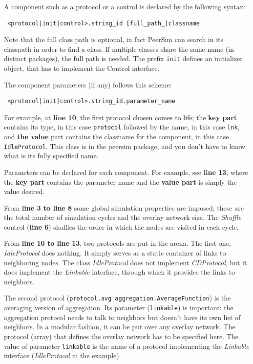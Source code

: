 \documentclass[a4paper,11pt]{article}
\begin{document}
A component such as a protocol or a control is declared by  the
following syntax:

\begin{verbatim} <protocol|init|control>.string_id [full_path_]classname
\end{verbatim}

Note that the full class path is optional, in fact PeerSim can search
in its classpath in order to find a class. If multiple classes share
the same name (in distinct packages), the full path is needed.
The prefix {\tt init} defines an initializer object, that has to implement
the Control interface.
  
The component parameters (if any) follows this scheme:

\begin{verbatim} <protocol|init|control>.string_id.parameter_name
\end{verbatim}

For example, at \textbf{line 10}, the first protocol chosen comes to life;
the \textbf{key part} contains its type, in this case {\tt protocol}
followed by the name, in this case {\tt lnk}, and \textbf{the
value} part contains the classname for the component, in this case
{\tt IdleProtocol}.
This class is in the peersim package, and you don't have to know what is
its fully specified name.

Parameters can be declared for each component.
For example, see \textbf{line 13}, where the \textbf{key part} contains the
parameter name and the \textbf{value part} is simply the value desired.

From \textbf{line 3 to line 8}
some global simulation properties are imposed; these are the total
number of simulation cycles and the overlay network size. The
\emph{Shuffle} control (\textbf{line 6}) shuffles the order in which the nodes
are visited in each cycle. 

From \textbf{line 10 to line 13}, two protocols are put in the arena.
The first one, \emph{IdleProtocol} does nothing.
It simply serves as a static container of links to neighboring nodes.
The class \emph{IdleProtocol} does not implement \emph{CDProtocol}, but it
does implement the \emph{Linkable} interface, through which it provides
the links to neighbors.

The second protocol (\texttt{protocol.avg aggregation.AverageFunction})
is the averaging version of aggregation. Its parameter (\texttt{linkable})
is important: the aggregation protocol needs to talk to neighbors
but doesn't have its own list of neighbors.
In a modular fashion, it can be put over any overlay network.
The protocol (array) that defines the overlay network has to be specified
here.
The value of parameter {\tt linkable} is the name
of a protocol implementing  the \emph{Linkable} interface
(\emph{IdleProtocol}
in the example).
\end{document}
